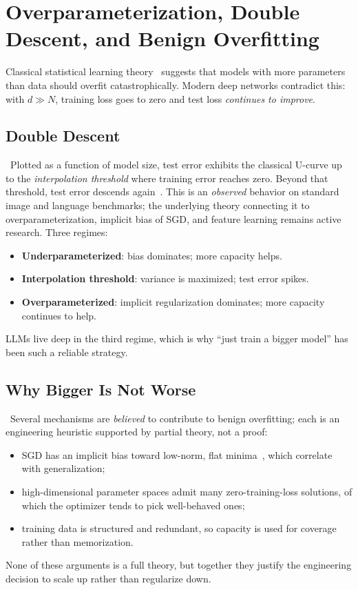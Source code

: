 \section{Overparameterization, Double Descent, and Benign Overfitting}

Classical statistical learning
theory~\citep{vapnik1998statistical,bishop2006prml} suggests that models
with more parameters than data should overfit catastrophically. Modern
deep networks contradict this: with $d \gg N$, training loss goes to
zero and test loss \emph{continues to improve}.

\subsection{Double Descent}

\Emp\ Plotted as a function of model size, test error exhibits the
classical U-curve up to the \emph{interpolation threshold} where
training error reaches zero. Beyond that threshold, test error
descends again~\citep{belkin2019reconciling,nakkiran2020double}. This
is an \emph{observed} behavior on standard image and language
benchmarks; the underlying theory connecting it to overparameterization,
implicit bias of SGD, and feature learning remains active research.
Three regimes:
\begin{itemize}
  \item \textbf{Underparameterized}: bias dominates; more capacity helps.
  \item \textbf{Interpolation threshold}: variance is maximized;
        test error spikes.
  \item \textbf{Overparameterized}: implicit regularization dominates;
        more capacity continues to help.
\end{itemize}
LLMs live deep in the third regime, which is why ``just train a bigger
model'' has been such a reliable strategy.

\subsection{Why Bigger Is Not Worse}

\Heur\ Several mechanisms are \emph{believed} to contribute to benign
overfitting; each is an engineering heuristic supported by partial
theory, not a proof:
\begin{itemize}
  \item SGD has an implicit bias toward low-norm, flat
        minima~\citep{keskar2017large}, which correlate with
        generalization;
  \item high-dimensional parameter spaces admit many zero-training-loss
        solutions, of which the optimizer tends to pick well-behaved
        ones;
  \item training data is structured and redundant, so capacity is used
        for coverage rather than memorization.
\end{itemize}
None of these arguments is a full theory, but together they justify the
engineering decision to scale up rather than regularize down.

